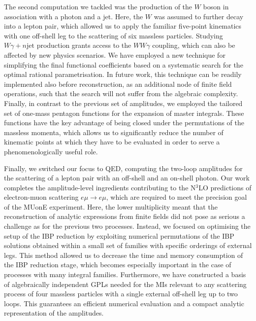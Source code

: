 \documentclass[main.tex]{subfiles}
\begin{document}
The second computation we tackled was the production of the $W$ boson in association with a photon and a jet. Here, the $W$ was assumed to further decay into a lepton pair, which allowed us to apply the familiar five-point kinematics with one off-shell leg to the scattering of six massless particles. Studying $W\gamma + n \text{jet}$ production grants access to the $W W \gamma$ coupling, which can also be affected by new physics scenarios. We have employed a new technique for simplifying the final functional coefficients based on a systematic search for the optimal rational parametrisation. In future work, this technique can be readily implemented also before reconstruction, as an additional node of finite field operations, such that the search will not suffer from the algebraic complexity. Finally, in contrast to the previous set of amplitudes, we employed the tailored set of one-mass pentagon functions for the expansion of master integrals. These functions have the key advantage of being closed under the permutations of the massless momenta, which allows us to significantly reduce the number of kinematic points at which they have to be evaluated in order to serve a phenomenologically useful role.

Finally, we switched our focus to QED, computing the two-loop amplitudes for the scattering of a lepton pair with an off-shell and an on-shell photon. Our work completes the amplitude-level ingredients contributing to the N$^3$LO predictions of electron-muon scattering $e \mu \to e \mu$, which are required to meet the precision goal of the MUonE experiment. Here, the lower multiplicity meant that the reconstruction of analytic expressions from finite fields did not pose as serious a challenge as for the previous two processes. Instead, we focused on optimising the setup of the IBP reduction by exploiting numerical permutations of the IBP solutions obtained within a small set of families with specific orderings of external legs. This method allowed us to decrease the time and memory consumption of the IBP reduction stage, which becomes especially important in the case of processes with many integral families. Furthermore, we have constructed a basis of algebraically independent GPLs needed for the MIs relevant to any scattering process of four massless particles with a single external off-shell leg up to two loops. This guarantees an efficient numerical evaluation and a compact analytic representation of the amplitudes.
\end{document}
